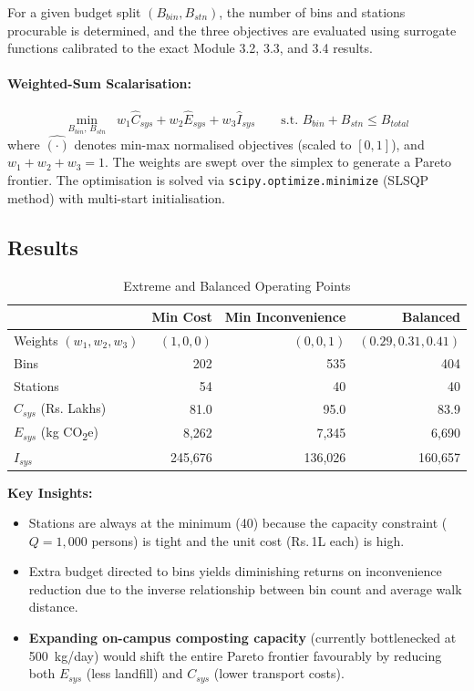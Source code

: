 \documentclass[11pt,a4paper]{article}
\begin{document}
For a given budget split $(B_{bin}, B_{stn})$, the number of bins and stations procurable is determined, and the three objectives are evaluated using surrogate functions calibrated to the exact Module 3.2, 3.3, and 3.4 results.

\paragraph{Weighted-Sum Scalarisation:}
\begin{equation}
    \min_{B_{bin},\, B_{stn}} \;\; w_1 \hat{C}_{sys} + w_2 \hat{E}_{sys} + w_3 \hat{I}_{sys} \qquad \text{s.t. } B_{bin} + B_{stn} \le B_{total}
\end{equation}
where $\hat{(\cdot)}$ denotes min-max normalised objectives (scaled to $[0,1]$), and $w_1 + w_2 + w_3 = 1$. The weights are swept over the simplex to generate a Pareto frontier. The optimisation is solved via \texttt{scipy.optimize.minimize} (SLSQP method) with multi-start initialisation.

\subsection{Results}

\begin{table}[H]
\centering
\caption{Extreme and Balanced Operating Points}
\begin{tabular}{lrrr}
\toprule
& \textbf{Min Cost} & \textbf{Min Inconvenience} & \textbf{Balanced} \\ \midrule
Weights $(w_1, w_2, w_3)$ & $(1, 0, 0)$ & $(0, 0, 1)$ & $(0.29, 0.31, 0.41)$ \\
Bins & 202 & 535 & 404 \\
Stations & 54 & 40 & 40 \\
$C_{sys}$ (Rs. Lakhs) & 81.0 & 95.0 & 83.9 \\
$E_{sys}$ (kg CO\textsubscript{2}e) & 8,262 & 7,345 & 6,690 \\
$I_{sys}$ & 245,676 & 136,026 & 160,657 \\
\bottomrule
\end{tabular}
\end{table}

\textbf{Key Insights:}
\begin{itemize}
    \item Stations are always at the minimum (40) because the capacity constraint ($Q = 1{,}000$ persons) is tight and the unit cost (Rs.\,1L each) is high.
    \item Extra budget directed to bins yields diminishing returns on inconvenience reduction due to the inverse relationship between bin count and average walk distance.
    \item \textbf{Expanding on-campus composting capacity} (currently bottlenecked at 500~kg/day) would shift the entire Pareto frontier favourably by reducing both $E_{sys}$ (less landfill) and $C_{sys}$ (lower transport costs).
\end{itemize}
\end{document}

